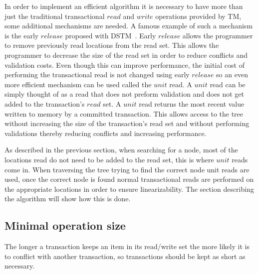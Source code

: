 \documentclass[10pt]{sigplanconf}
\begin{document}
In order to implement an efficient algorithm it is necessary to have more than just the traditional transactional $read$ and $write$ operations provided by TM, some additional mechanisms are needed.
A famous example of such a mechanism is the early $release$ proposed with 
DSTM~\cite{HLMS03}.
Early $release$ allows the programmer to remove previously read locations from the read set.
This allows the programmer to decrease the size of the read set in order to reduce conflicts and validation costs.
Even though this can improve performance, the initial cost of performing the transactional read is not changed using early $release$ so an even more efficient mechanism can be used called the $unit$ read.
A $unit$ read can be simply thought of as a read that does not preform validation and does not get added to the transaction's $read$ set.
A $unit$ read returns the most recent value written to memory by a  committed transaction.
This allows access to the tree without increasing the size of the transaction's read set and without performing validations thereby reducing conflicts and increasing performance.

As described in the previous section, when searching for a node, most of the locations read do not need to be added to the read set, this is where $unit$ reads come in.
When traversing the tree trying to find the correct node unit reads are used, once the correct node is found normal transactional reads are performed on the appropriate locations in order to ensure linearizability.
The section describing the algorithm will show how this is done.

\subsection{Minimal operation size}
The longer a transaction keeps an item in its read/write set the more likely it is to conflict with another transaction, so transactions should be kept as short as necessary.
\end{document}
